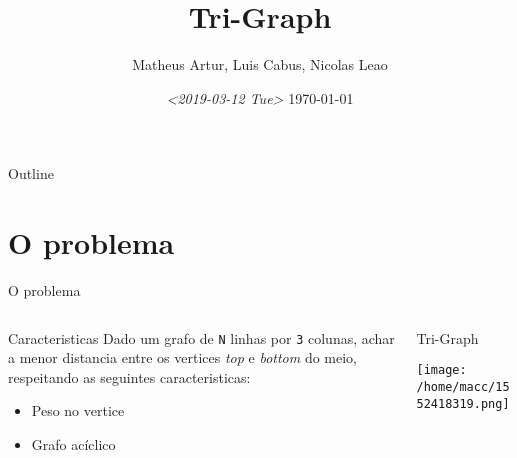 \documentclass[presentation]{beamer}
\author{Matheus Artur, Luis Cabus, Nicolas Leao}
\date{\textit{<2019-03-12 Tue>} \today}
\title{Tri-Graph}
\begin{document}
\maketitle
\begin{frame}{Outline}
\tableofcontents
\end{frame}


\section{O problema}
\label{sec:org28a296d}
\begin{frame}[fragile,label={sec:org1bc6b15}]{O problema}
 \begin{columns}
\begin{column}{0.48\columnwidth}
\begin{block}{Caracteristicas}
    Dado um grafo de \texttt{N} linhas por \texttt{3} colunas, achar a menor distancia 
entre os vertices \emph{top} e \emph{bottom} do meio, respeitando as seguintes caracteristicas:
\begin{itemize}
\item Peso no vertice
\item Grafo acíclico
\end{itemize}
\end{block}
\end{column}

\begin{column}{0.48\columnwidth}
\begin{block}{Tri-Graph}
\begin{center}
\texttt{[image: /home/macc/1552418319.png]}
\label{org358539f}
\end{center}
\end{block}
\end{column}
\end{columns}
\end{frame}
\end{document}
